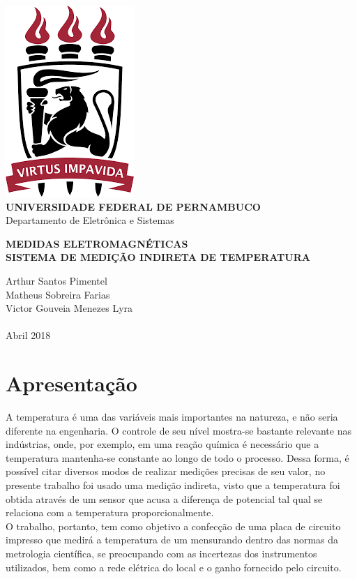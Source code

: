 \documentclass[14pt, oneside]{book}
\newcommand\tab[1][1cm]{\hspace*{#1}}
\theoremstyle{definition}
\begin{document}

    \begin{titlepage}
        \centering 
        \includegraphics[scale = 0.8]{ufpe.png} \\
        \Large{\textbf{UNIVERSIDADE FEDERAL DE PERNAMBUCO}}\\
        \large{Departamento de Eletrônica e Sistemas}
   
        \Huge\textbf{MEDIDAS ELETROMAGNÉTICAS}\\
        \Large\textbf{SISTEMA DE MEDIÇÃO INDIRETA DE TEMPERATURA}
   
        \vfill
        \Large{Arthur Santos Pimentel} \\
        \Large{Matheus Sobreira Farias} \\
        \Large{Victor Gouveia Menezes Lyra}
        \\~\\
        \Large{Abril 2018}
    \end{titlepage}

    
    \mainmatter
        \chapter{Apresentação}
            \tab A temperatura é uma das variáveis mais importantes na natureza, e não seria diferente na engenharia. O controle de seu nível mostra-se bastante relevante nas indústrias, onde, por exemplo, em uma reação química é necessário que a temperatura mantenha-se constante ao longo de todo o processo. Dessa forma, é possível citar diversos modos de realizar medições precisas de seu valor, no presente trabalho foi usado uma medição indireta, visto que a temperatura foi obtida através de um sensor que acusa a diferença de potencial tal qual se relaciona com a temperatura proporcionalmente. \\
            \tab O trabalho, portanto, tem como objetivo a confecção de uma placa de circuito impresso que medirá a temperatura de um mensurando dentro das normas da metrologia científica, se preocupando com as incertezas dos instrumentos utilizados, bem como a rede elétrica do local e o ganho fornecido pelo circuito.
                
\end{document}
